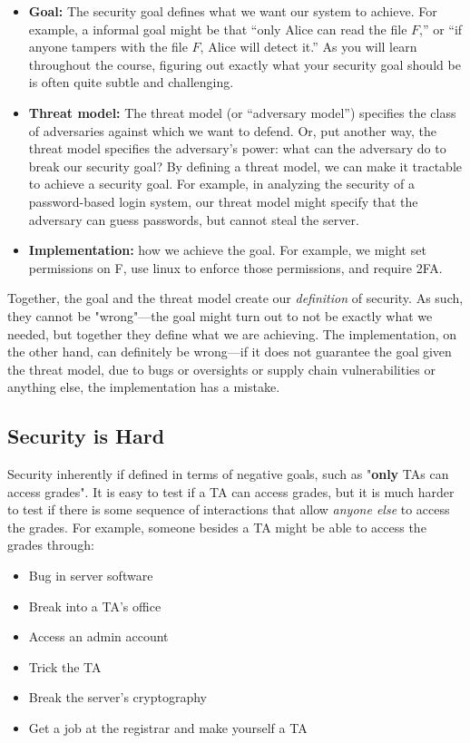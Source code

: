 \begin{itemize}
  \item \textbf{Goal:} 
    The security goal defines what we want our system to achieve.
    For example, a informal goal might be that ``only Alice can read the file $F$,''
    or ``if anyone tampers with the file $F$, Alice will detect it.''
    As you will learn throughout the course, figuring out exactly what your
    security goal should be is often quite subtle and challenging.

  \item \textbf{Threat model:} 
    The threat model (or ``adversary model'') specifies the class of 
    adversaries against which we want to defend.
    Or, put another way, the threat model specifies the adversary's power:
    what can the adversary do to break our security goal?
    By defining a threat model, we can make it
    tractable to achieve a security goal. 
    For example, in analyzing the security of a password-based login system,
    our threat model might specify that 
    the adversary can guess passwords, but cannot steal the server.
  \item \textbf{Implementation:} how we achieve the goal. For example, we might set permissions on F, use linux to enforce those permissions, and require 2FA.
\end{itemize}

Together, the goal and the threat model create our \textit{definition} of security. As such, they cannot be "wrong"---the goal might turn out to not be exactly what we needed, but together they define what we are achieving. The implementation, on the other hand, can definitely be wrong---if it does not guarantee the goal given the threat model, due to bugs or oversights or supply chain vulnerabilities or anything else, the implementation has a mistake.

\subsection{Security is Hard}
Security inherently if defined in terms of negative goals, such as "\textbf{only} TAs can access grades". It is easy to test if a TA can access grades, but it is much harder to test if there is some sequence of interactions that allow \textit{anyone else} to access the grades. For example, someone besides a TA might be able to access the grades through:

\begin{itemize}
	\item Bug in server software
	\item Break into a TA's office
	\item Access an admin account
	\item Trick the TA
	\item Break the server's cryptography
	\item Get a job at the registrar and make yourself a TA
\end{itemize}

